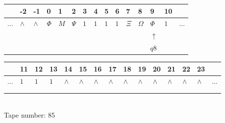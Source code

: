 \documentclass[11pt]{article}
\begin{document}
\begin{table}[H]
\centering
\begin{tabular}{lllllllllllllll}
 & -2 & -1 & 0 & 1 & 2 & 3 & 4 & 5 & 6 & 7 & 8 & 9 & 10 & \\
\hline
$...$ & \multicolumn{1}{|l|}{$\wedge$} & \multicolumn{1}{|l|}{$\wedge$} & \multicolumn{1}{|l|}{$\Phi$} & \multicolumn{1}{|l|}{$M$} & \multicolumn{1}{|l|}{$\Psi$} & \multicolumn{1}{|l|}{$1$} & \multicolumn{1}{|l|}{$1$} & \multicolumn{1}{|l|}{$1$} & \multicolumn{1}{|l|}{$1$} & \multicolumn{1}{|l|}{$\Xi$} & \multicolumn{1}{|l|}{$\Omega$} & \multicolumn{1}{|l|}{$\Phi$} & \multicolumn{1}{|l|}{$1$} & $...$\\
\hline
&  &  &  &  &  &  &  &  &  &  &  & $\uparrow$ &  &  \\
&  &  &  &  &  &  &  &  &  &  &  & $ q8 $ &  &  \\
\end{tabular}
\begin{tabular}{lllllllllllllll}
 & 11 & 12 & 13 & 14 & 15 & 16 & 17 & 18 & 19 & 20 & 21 & 22 & 23 & \\
\hline
$...$ & \multicolumn{1}{|l|}{$1$} & \multicolumn{1}{|l|}{$1$} & \multicolumn{1}{|l|}{$1$} & \multicolumn{1}{|l|}{$\wedge$} & \multicolumn{1}{|l|}{$\wedge$} & \multicolumn{1}{|l|}{$\wedge$} & \multicolumn{1}{|l|}{$\wedge$} & \multicolumn{1}{|l|}{$\wedge$} & \multicolumn{1}{|l|}{$\wedge$} & \multicolumn{1}{|l|}{$\wedge$} & \multicolumn{1}{|l|}{$\wedge$} & \multicolumn{1}{|l|}{$\wedge$} & \multicolumn{1}{|l|}{$\wedge$} & $...$\\
\hline
&  &  &  &  &  &  &  &  &  &  &  &  &  &  \\
&  &  &  &  &  &  &  &  &  &  &  &  &  &  \\
\end{tabular}
\\
Tape number: 85
\noindent\makebox[\linewidth]{\hdashrule{\textwidth}{1pt}{1pt}}\end{table}
\end{document}
